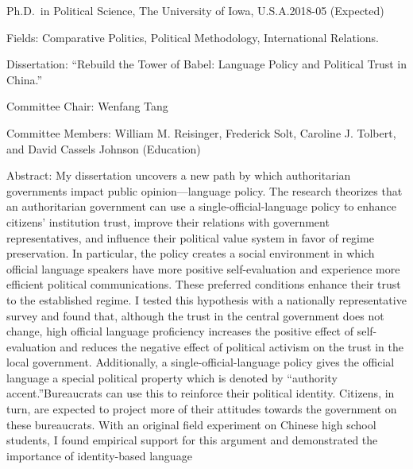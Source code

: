 \documentclass[10.5pt,]{article}
\providecommand{\tightlist}{%
	\setlength{\itemsep}{0pt}\setlength{\parskip}{0pt}}
\renewenvironment{itemize}{
	\begin{list}{}{
			\setlength{\leftmargin}{1.5em}
		}
	}{
	\end{list}
}
\begin{document}
\begin{itemize}
\tightlist
\item
  Ph.D.~in Political Science, The University of Iowa,
  U.S.A.\hfill 2018-05 (Expected)

  \begin{itemize}
  \tightlist
  \item
    \footnotesize Fields: Comparative Politics, Political Methodology,
    International Relations.
  \item
    \footnotesize Dissertation: ``Rebuild the Tower of Babel: Language
    Policy and Political Trust in China.''

    \begin{itemize}
    \tightlist
    \item
      Committee Chair: Wenfang Tang
    \item
      Committee Members: William M. Reisinger, Frederick Solt, Caroline
      J. Tolbert, and David Cassels Johnson (Education)
    \item
      Abstract: My dissertation uncovers a new path by which
      authoritarian governments impact public opinion---language policy.
      The research theorizes that an authoritarian government can use a
      single-official-language policy to enhance citizens' institution
      trust, improve their relations with government representatives,
      and influence their political value system in favor of regime
      preservation. In particular, the policy creates a social
      environment in which official language speakers have more positive
      self-evaluation and experience more efficient political
      communications. These preferred conditions enhance their trust to
      the established regime. I tested this hypothesis with a nationally
      representative survey and found that, although the trust in the
      central government does not change, high official language
      proficiency increases the positive effect of self-evaluation and
      reduces the negative effect of political activism on the trust in
      the local government. Additionally, a single-official-language
      policy gives the official language a special political property
      which is denoted by ``authority accent.''Bureaucrats can use this
      to reinforce their political identity. Citizens, in turn, are
      expected to project more of their attitudes towards the government
      on these bureaucrats. With an original field experiment on Chinese
      high school students, I found empirical support for this argument
      and demonstrated the importance of identity-based language

\end{itemize}
\end{itemize}
\end{itemize}
\end{document}
